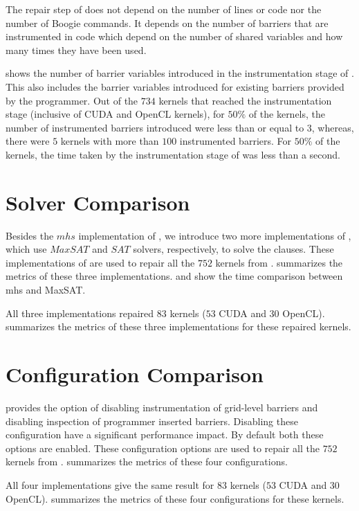 

The repair step of \tool does not depend on the number of lines or code nor the number of Boogie commands. It depends on the number of barriers that are instrumented in code which depend on the number of shared variables and how many times they have been used.

 shows the number of barrier variables introduced in the instrumentation stage of \tool. This also includes the barrier variables introduced for existing barriers provided by the programmer. Out of the $734$ kernels that reached the instrumentation stage (inclusive of CUDA and OpenCL kernels), for $50\%$ of the kernels, the number of instrumented barriers introduced were less than or equal to $3$, whereas, there were $5$ kernels with more than $100$ instrumented barriers. For $50\%$ of the kernels, the time taken by the instrumentation stage of \tool was less than a second.

\section{Solver Comparison}

Besides the $mhs$ implementation of \tool, we introduce two more implementations of \tool, which use $MaxSAT$ and $SAT$ solvers, respectively, to solve the clauses. These implementations of \tool are used to repair all the $752$ kernels from .  summarizes the metrics of these three implementations.  and  show the time comparison between mhs and MaxSAT.




All three implementations repaired $83$ kernels ($53$ CUDA and $30$ OpenCL).  summarizes the metrics of these three implementations for these repaired kernels.



\section{Configuration Comparison}

\tool provides the option of disabling instrumentation of grid-level barriers and disabling inspection of programmer inserted barriers. Disabling these configuration have a significant performance impact. By default both these options are enabled. These configuration options are used to repair all the $752$ kernels from .  summarizes the metrics of these four configurations.



All four implementations give the same result for $83$ kernels ($53$ CUDA and $30$ OpenCL).  summarizes the metrics of these four configurations for these kernels.


